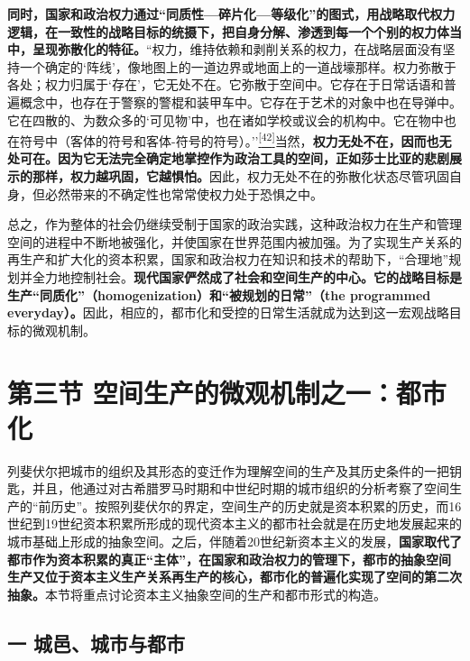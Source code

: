 \documentclass[UTF8, fontset = sourcesans, a4paper, oneside, zihao =
-4, scheme=chinese, no-math, space=true]{ctexbook}
\begin{document}
\textbf{同时，国家和政治权力通过``同质性---碎片化---等级化''的图式，用战略取代权力逻辑，在一致性的战略目标的统摄下，把自身分解、渗透到每一个个别的权力体当中，呈现弥散化的特征。}``权力，维持依赖和剥削关系的权力，在战略层面没有坚持一个确定的`阵线'，像地图上的一道边界或地面上的一道战壕那样。权力弥散于各处；权力归属于`存在'，它无处不在。它弥散于空间中。它存在于日常话语和普遍概念中，也存在于警察的警棍和装甲车中。它存在于艺术的对象中也在导弹中。它在四散的、为数众多的`可见物'中，也在诸如学校或议会的机构中。它在物中也在符号中（客体的符号和客体-符号的符号）。''\protect\hypertarget{part0007_split_002.htmlux5cux23w42}{}{}\protect\hyperlink{part0007_split_004.htmlux5cux23m42}{\textsuperscript{{[}42{]}}}当然，\textbf{权力无处不在，因而也无处可在。因为它无法完全确定地掌控作为政治工具的空间，正如莎士比亚的悲剧展示的那样，权力越巩固，它越惧怕。}因此，权力无处不在的弥散化状态尽管巩固自身，但必然带来的不确定性也常常使权力处于恐惧之中。

总之，作为整体的社会仍继续受制于国家的政治实践，这种政治权力在生产和管理空间的进程中不断地被强化，并使国家在世界范围内被加强。为了实现生产关系的再生产和扩大化的资本积累，国家和政治权力在知识和技术的帮助下，``合理地''规划并全力地控制社会。\textbf{现代国家俨然成了社会和空间生产的中心。它的战略目标是生产``同质化''（homogenization）和``被规划的日常''（the
programmed
everyday）。}因此，相应的，都市化和受控的日常生活就成为达到这一宏观战略目标的微观机制。

\protect\hypertarget{part0007_split_003.html}{}{}

\hypertarget{part0007_split_003.htmlux5cux23b009}{\section{第三节
空间生产的微观机制之一：都市化}\label{part0007_split_003.htmlux5cux23b009}}

列斐伏尔把城市的组织及其形态的变迁作为理解空间的生产及其历史条件的一把钥匙，并且，他通过对古希腊罗马时期和中世纪时期的城市组织的分析考察了空间生产的``前历史''。按照列斐伏尔的界定，空间生产的历史就是资本积累的历史，而16世纪到19世纪资本积累所形成的现代资本主义的都市社会就是在历史地发展起来的城市基础上形成的抽象空间。之后，伴随着20世纪新资本主义的发展，\textbf{国家取代了都市作为资本积累的真正``主体''，在国家和政治权力的管理下，都市的抽象空间生产又位于资本主义生产关系再生产的核心，都市化的普遍化实现了空间的第二次抽象。}本节将重点讨论资本主义抽象空间的生产和都市形式的构造。

\subsection{一
城邑、城市与都市}\label{part0007_split_003.htmlux5cux23c030}
\end{document}

